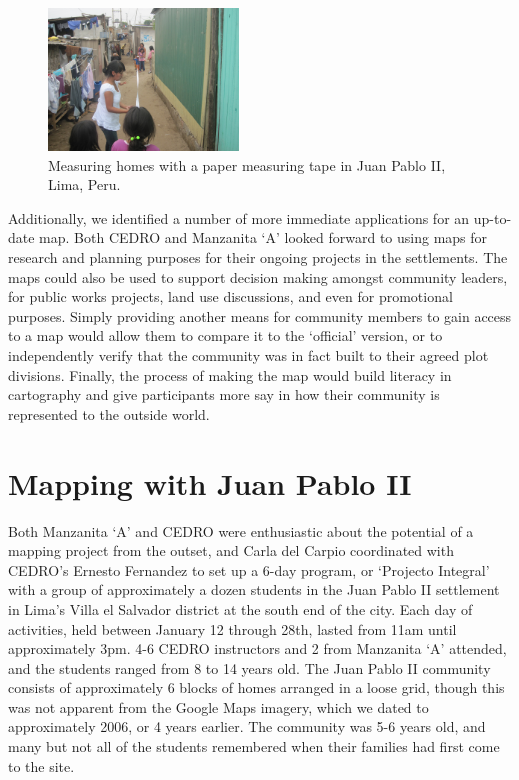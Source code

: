 \documentclass[11pt,oneside,notitlepage]{report}
\begin{document}
{{\begin{figure}
	\begin{flushright}
		\includegraphics[width=0.45\textwidth]{images/juan-pablo-measuring.jpg}
		\caption{Measuring homes with a paper measuring tape in Juan Pablo II, Lima, Peru.}
	\end{flushright}
\end{figure}

Additionally, we identified a number of more immediate applications for an up-to-date map. Both \ac{CEDRO} and Manzanita `A' looked forward to using maps for research and planning purposes for their ongoing projects in the settlements. The maps could also be used to support decision making amongst community leaders, for public works projects, land use discussions, and even for promotional purposes. Simply providing another means for community members to gain access to a map would allow them to compare it to the `official' version, or to independently verify that the community was in fact built to their agreed plot divisions. Finally, the process of making the map would build literacy in cartography and give participants more say in how their community is represented to the outside world.  

\section{Mapping with Juan Pablo II}

Both Manzanita `A' and \ac{CEDRO} were enthusiastic about the potential of a mapping project from the outset, and Carla del Carpio coordinated with \ac{CEDRO}'s Ernesto Fernandez to set up a 6-day program, or `Projecto Integral' with a group of approximately a dozen students in the Juan Pablo II settlement in Lima's Villa el Salvador district at the south end of the city. Each day of activities, held between January 12 through 28th, lasted from 11am until approximately 3pm. 4-6 \ac{CEDRO} instructors and 2 from Manzanita `A' attended, and the  students ranged from 8 to 14 years old. The Juan Pablo II community consists of approximately 6 blocks of homes arranged in a loose grid, though this was not apparent from the Google Maps imagery, which we dated to approximately 2006, or 4 years earlier. The community was 5-6 years old, and many but not all of the students remembered when their families had first come to the site. 

}}
\end{document}
